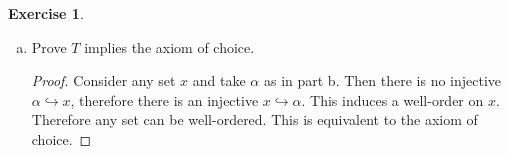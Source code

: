 \documentclass{article}
\theoremstyle{definition}
\newtheorem{question}{Exercise}
\begin{document}
\begin{question}
\begin{enumerate}[a.]
\begin{proof}
                  Now suppose there is an injection \(f:\alpha\hookrightarrow
                  x\). Then \(f[\alpha]\subseteq x\) can be well-ordered with
                  the well-order induced by \(f\). In particular
                  \(f[\alpha]\cong \alpha\) as a well-order. This means that as
                  an ordinal \(\alpha\in\alpha\) which contradicts the fact that
                  \(\in\) well-orders the ordinals.
              \end{proof}

        \item Prove \(T\) implies the axiom of choice.

              \begin{proof}
                  Consider any set \(x\) and take \(\alpha\) as in part b. Then
                  there is no injective \(\alpha\hookrightarrow x\), therefore
                  there is an injective \(x\hookrightarrow\alpha\). This induces
                  a well-order on \(x\). Therefore any set can be well-ordered.
                  This is equivalent to the axiom of choice.
              \end{proof}
    \end{enumerate}
\end{question}
\end{document}

